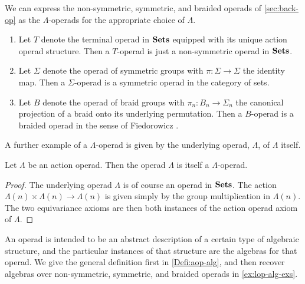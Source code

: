 \begin{example}\label{ex:lop-exs}
We can express the non-symmetric, symmetric, and braided operads of \cref{sec:back-op} as the $\Lambda$-operads for the appropriate choice of $\Lambda$.
  \begin{enumerate}
    \item Let $T$ denote the terminal operad in $\mathbf{Sets}$ equipped with its unique action operad structure. Then a $T$-operad is just a non-symmetric operad in $\mathbf{Sets}$.
    \item Let $\Sigma$ denote the operad of symmetric groups with $\pi \colon \Sigma \rightarrow \Sigma$ the identity map. Then a $\Sigma$-operad is a symmetric operad in the category of sets.
    \item Let $B$ denote the operad of braid groups with $\pi_{n} \colon B_{n} \rightarrow \Sigma_{n}$ the canonical projection of a braid onto its underlying permutation. Then a $B$-operad is a braided operad in the sense of Fiedorowicz \cite{fie-br}.
  \end{enumerate}
\end{example}

A further example of a $\Lambda$-operad is given by the underlying operad, $\Lambda$, of $\Lambda$ itself.
\begin{prop}\label{prop:gisgop}
Let $\Lambda$ be an action operad. Then the operad $\Lambda$ is itself a $\Lambda$-operad.
\end{prop}
\begin{proof}
The underlying operad $\Lambda$ is of course an operad in $\mathbf{Sets}$. The action $\Lambda(n) \times \Lambda(n) \rightarrow \Lambda(n)$ is given simply by the group multiplication in $\Lambda(n)$. The two equivariance axioms are then both instances of the action operad axiom of $\Lambda$.
\end{proof}

An operad is intended to be an abstract description of a certain type of algebraic structure, and the particular instances of that structure are the algebras for that operad. 
We give the general definition first in \cref{Defi:aop-alg}, and then recover algebras over non-symmetric, symmetric, and braided operads in \cref{ex:lop-alg-exs}.

